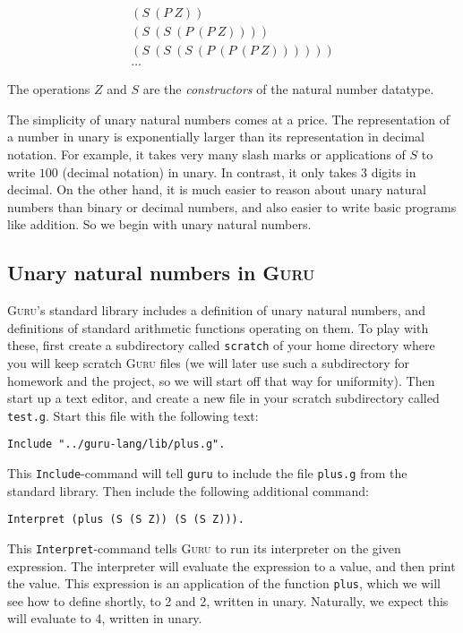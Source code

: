 \documentclass{book}[12pt]
\newcommand{\guru}[0]{\textsc{Guru}\xspace}
\begin{document}
\[ 
\begin{array}{l}
(S\ (P\ Z)) \\
(S\ (S\ (P\ (P\ Z)))) \\
(S\ (S\ (S\ (P\ (P\ (P\ Z)))))) \\
\ldots
\end{array}
\]

\noindent The operations $Z$ and $S$ are the \emph{constructors} of
the natural number datatype.

The simplicity of unary natural numbers comes at a price.  The
representation of a number in unary is exponentially larger than its
representation in decimal notation.  For example, it takes very many
slash marks or applications of $S$ to write $100$ (decimal notation)
in unary.  In contrast, it only takes 3 digits in decimal.  On the
other hand, it is much easier to reason about unary natural numbers
than binary or decimal numbers, and also easier to write basic
programs like addition.  So we begin with unary natural numbers.

\subsection{Unary natural numbers in \guru}
\label{ch2:natguru}

\guru's standard library includes a definition of unary natural
numbers, and definitions of standard arithmetic functions operating on
them.  To play with these, first create a subdirectory called
\texttt{scratch} of your home directory where you will keep scratch
\guru files (we will later use such a subdirectory for homework and
the project, so we will start off that way for uniformity).  Then
start up a text editor, and create a new file in your scratch
subdirectory called \texttt{test.g}.  Start this file with the
following text:

\begin{verbatim}
Include "../guru-lang/lib/plus.g".
\end{verbatim}

\noindent This \texttt{Include}-command will tell \texttt{guru} to
include the file \texttt{plus.g} from the standard library.  Then
include the following additional command:

\begin{verbatim}
Interpret (plus (S (S Z)) (S (S Z))).
\end{verbatim}

\noindent This \texttt{Interpret}-command tells \guru to run its
interpreter on the given expression.  The interpreter will evaluate
the expression to a value, and then print the value.  This expression
is an application of the function \texttt{plus}, which we will see how
to define shortly, to 2 and 2, written in unary.  Naturally, we expect
this will evaluate to 4, written in unary.
\end{document}
